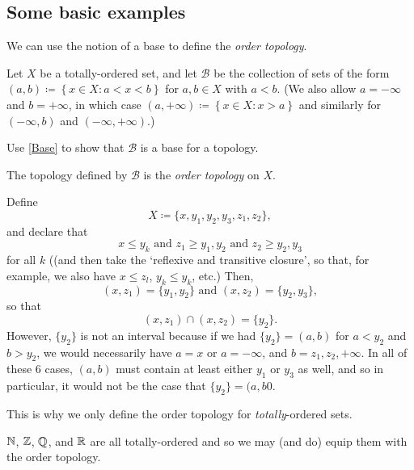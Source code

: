 \subsection{Some basic examples}

We can use the notion of a base to define the \emph{order topology}.
\begin{dfn}\label{OrderTopology}
Let $X$ be a totally-ordered set, and let $\mathcal{B}$ be the collection of sets of the form $(a,b)\coloneqq \left\{ x\in X:a<x<b\right\}$ for $a,b\in X$ with $a<b$.  (We also allow $a=-\infty$ and $b=+\infty$, in which case $(a,+\infty )\coloneqq \left\{ x\in X:x>a\right\}$ and similarly for $(-\infty ,b)$ and $(-\infty, +\infty)$.)
\begin{exr}
Use \cref{Base} to show that $\mathcal{B}$ is a base for a topology.
\end{exr}
The topology defined by $\mathcal{B}$ is the \emph{order topology} on $X$.
\end{dfn}
\begin{exm}
Define
\begin{equation}
X\coloneqq \{ x,y_1,y_2,y_3,z_1,z_2\} ,
\end{equation}
and declare that
\begin{equation}
x\leq y_k\text{ and }z_1\geq y_1,y_2\text{ and }z_2\geq y_2,y_3
\end{equation}
for all $k$ ((and then take the `reflexive and transitive closure', so that, for example, we also have $x\leq z_l$, $y_k\leq y_k$, etc.)  Then,
\begin{equation}
(x,z_1)=\{ y_1,y_2\} \text{ and }(x,z_2)=\{ y_2,y_3\} ,
\end{equation}
so that
\begin{equation}
(x,z_1)\cap (x,z_2)=\{ y_2\} .
\end{equation}
However, $\{ y_2\}$ is not an interval because if we had $\{ y_2\} =(a,b)$ for $a<y_2$ and $b>y_2$, we would necessarily have $a=x$ or $a=-\infty$, and $b=z_1,z_2,+\infty$.  In all of these $6$ cases, $(a,b)$ must contain at least either $y_1$ or $y_3$ as well, and so in particular, it would not be the case that $\{ y_2\} =(a,b0$.
\begin{rmk}
This is why we only define the order topology for \emph{totally}-ordered sets.
\end{rmk}
\end{exm}
\begin{exm}[$\N$, $\Z$, $\Q$, and $\R$]\label{exm3.1.21}
$\N$, $\Z$, $\Q$, and $\R$ are all totally-ordered and so we may (and do) equip them with the order topology.
\end{exm}
